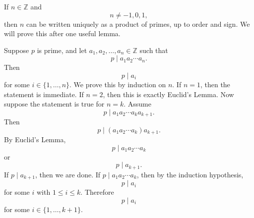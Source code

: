 \begin{theorem}{
    If $n\in\mathbb{Z}$ and
    \[
        n\neq -1,0,1,
    \]
    then $n$ can be written uniquely as a product of primes, up to order and sign.
}
    We will prove this after one useful lemma.
\end{theorem}

\begin{lemma}{
    Suppose $p$ is prime, and let $a_1,a_2,\dots,a_n\in\mathbb{Z}$ such that
    \[
        p\mid a_{1}a_2\cdots a_n.
    \]
    Then
    \[
        p\mid a_i
    \]
    for some $i\in\{1,\dots,n\}$.
}
    We prove this by induction on $n$.
    If $n=1$, then the statement is immediate.
    If $n=2$, then this is exactly Euclid's Lemma.
    Now suppose the statement is true for $n=k$.
    Assume
    \[
        p\mid a_{1}a_2\cdots a_k a_{k+1}.
    \]
    Then
    \[
        p\mid (a_{1}a_2\cdots a_k)a_{k+1}.
    \]
    By Euclid's Lemma,
    \[
        p\mid a_{1}a_2\cdots a_k
    \]
    or
    \[
        p\mid a_{k+1}.
    \]
    If $p\mid a_{k+1}$, then we are done.
    If $p\mid a_{1}a_2\cdots a_k$, then by the induction hypothesis,
    \[
        p\mid a_i
    \]
    for some $i$ with $1\leq i\leq k$.
    Therefore
    \[
        p\mid a_i
    \]
    for some $i\in\{1,\dots,k+1\}$.
\end{lemma}


